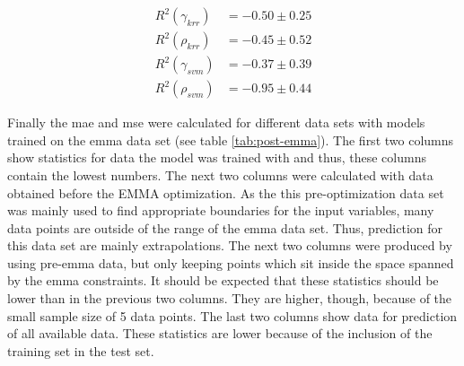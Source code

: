 \begin{align}
    \label{eq:r2-krr-g}
    R^2(\gamma_{krr}) &= -0.50 \pm 0.25\\
    \label{eq:r2-krr-p}
    R^2(\rho_{krr})   &= -0.45 \pm 0.52\\
    \label{eq:r2-svm-g}
    R^2(\gamma_{svm}) &= -0.37 \pm 0.39\\
    \label{eq:r2-svm-p}
    R^2(\rho_{svm})   &= -0.95 \pm 0.44
\end{align}

%
Finally the \gls{mae} and \gls{mse} were calculated for different data sets with models 
trained on the \gls{emma} data set (see table \ref{tab:post-emma}). 
The first two columns show statistics for data the model was trained with and thus, 
these columns contain the lowest numbers. 
The next two columns were calculated with data obtained before the EMMA optimization. 
As the this pre-optimization data set was mainly used to find appropriate boundaries for the input variables, 
many data points are outside of the range of the \gls{emma} data set. 
Thus, prediction for this data set are mainly extrapolations. 
The next two columns were produced by using pre-\gls{emma} data, 
but only keeping points which sit inside the space spanned by the \gls{emma} constraints. 
It should be expected that these statistics should be lower than in the previous two columns. 
They are higher, though, because of the small sample size of 5 data points. 
The last two columns show data for prediction of all available data. 
These statistics are lower because of the inclusion of the training set in the test set. 

